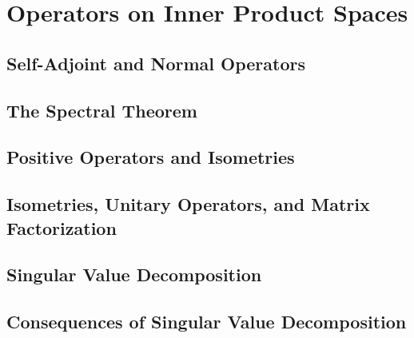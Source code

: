 \chapter{Operators on Inner Product Spaces}

\section{Self-Adjoint and Normal Operators}

\section{The Spectral Theorem}

\section{Positive Operators and Isometries}

\section{Isometries, Unitary Operators, and Matrix Factorization}

\section{Singular Value Decomposition}

\section{Consequences of Singular Value Decomposition}


